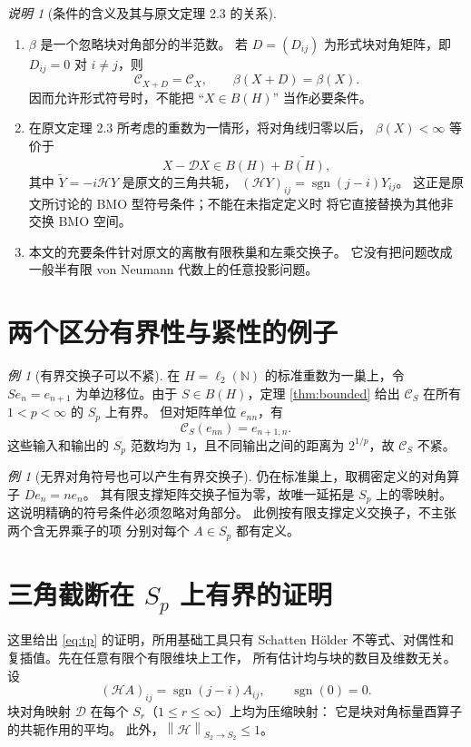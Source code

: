 \documentclass[UTF8,11pt,a4paper,fontset=fandol]{ctexart}
\theoremstyle{remark}
\newtheorem{remark}[theorem]{说明}
\newtheorem{example}[theorem]{例}
\newcommand{\DD}{\mathcal D}
\newcommand{\HH}{\mathcal H}
\newcommand{\CC}{\mathcal C}
\newcommand{\norm}[1]{\left\lVert #1\right\rVert}
\begin{document}
\begin{remark}[条件的含义及其与原文定理 2.3 的关系]
\leavevmode
\begin{enumerate}[label=\textup{(\arabic*)}]
 \item $\beta$ 是一个忽略块对角部分的半范数。
 若 $D=(D_{ij})$ 为形式块对角矩阵，即 $D_{ij}=0$ 对 $i\ne j$，则
 \[
  \CC_{X+D}=\CC_X,\qquad\beta(X+D)=\beta(X).
 \]
 因而允许形式符号时，不能把 ``$X\in B(H)$'' 当作必要条件。
 \item 在原文定理 2.3 所考虑的重数为一情形，将对角线归零以后，
 $\beta(X)<\infty$ 等价于
 \[
 X-\DD X\in B(H)+\widetilde{B(H)},
 \]
 其中 $\widetilde Y=-i\HH Y$ 是原文的三角共轭，
 $(\HH Y)_{ij}=\operatorname{sgn}(j-i)Y_{ij}$。
 这正是原文所讨论的 BMO 型符号条件；不能在未指定定义时
 将它直接替换为其他非交换 BMO 空间。
 \item 本文的充要条件针对原文的离散有限秩巢和左乘交换子。
 它没有把问题改成一般半有限 von Neumann 代数上的任意投影问题。
\end{enumerate}
\end{remark}

\section{两个区分有界性与紧性的例子}

\begin{example}[有界交换子可以不紧]
在 $H=\ell_2(\mathbb N)$ 的标准重数为一巢上，令
$Se_n=e_{n+1}$ 为单边移位。由于 $S\in B(H)$，定理 \ref{thm:bounded}
给出 $\CC_S$ 在所有 $1<p<\infty$ 的 $S_p$ 上有界。
但对矩阵单位 $e_{nn}$，有
\[
 \CC_S(e_{nn})=e_{n+1,n}.
\]
这些输入和输出的 $S_p$ 范数均为 $1$，且不同输出之间的距离为
$2^{1/p}$，故 $\CC_S$ 不紧。
\end{example}

\begin{example}[无界对角符号也可以产生有界交换子]
仍在标准巢上，取稠密定义的对角算子 $De_n=ne_n$。
其有限支撑矩阵交换子恒为零，故唯一延拓是 $S_p$ 上的零映射。
这说明精确的符号条件必须忽略对角部分。
此例按有限支撑定义交换子，不主张两个含无界乘子的项
分别对每个 $A\in S_p$ 都有定义。
\end{example}

\appendix
\section{三角截断在 \texorpdfstring{$S_p$}{Sp} 上有界的证明}

这里给出 \eqref{eq:tp} 的证明，所用基础工具只有 Schatten H\"older
不等式、对偶性和复插值。先在任意有限个有限维块上工作，
所有估计均与块的数目及维数无关。
设
\[
 (\HH A)_{ij}=\operatorname{sgn}(j-i)A_{ij},\qquad
 \operatorname{sgn}(0)=0.
\]
块对角映射 $\DD$ 在每个 $S_r$（$1\leq r\leq\infty$）上均为压缩映射：
它是块对角标量酉算子的共轭作用的平均。
此外，$\norm{\HH}_{S_2\to S_2}\leq1$。
\end{document}
